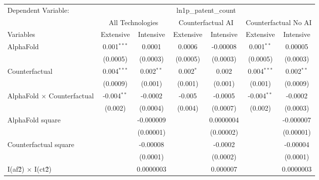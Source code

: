 \begingroup
\centering
\begin{tabular}{lcccccc}
   \tabularnewline \midrule \midrule
   Dependent Variable: & \multicolumn{6}{c}{ln1p\_patent\_count}\\
 & \multicolumn{2}{c}{All Technologies} & \multicolumn{2}{c}{Counterfactual AI} & \multicolumn{2}{c}{Counterfactual No AI} \\
\cmidrule(lr){1-1}\cmidrule(lr){2-3} \cmidrule(lr){4-5} \cmidrule(lr){6-7}
Variables & \multicolumn{1}{c}{Extensive} & \multicolumn{1}{c}{Intensive} & \multicolumn{1}{c}{Extensive} & \multicolumn{1}{c}{Intensive} & \multicolumn{1}{c}{Extensive} & \multicolumn{1}{c}{Intensive} \\
\cmidrule(lr){1-1}\cmidrule(lr){2-2} \cmidrule(lr){3-3} \cmidrule(lr){4-4} \cmidrule(lr){5-5} \cmidrule(lr){6-6} \cmidrule(lr){7-7}
   AlphaFold                          & 0.001$^{***}$ & 0.0001       & 0.0006      & -0.00008   & 0.001$^{**}$  & 0.00005\\   
                                      & (0.0005)      & (0.0003)     & (0.0005)    & (0.0003)   & (0.0005)      & (0.0003)\\   
   Counterfactual                     & 0.004$^{***}$ & 0.002$^{**}$ & 0.002$^{*}$ & 0.002      & 0.004$^{***}$ & 0.002$^{**}$\\   
                                      & (0.0009)      & (0.001)      & (0.001)     & (0.001)    & (0.001)       & (0.0009)\\   
   AlphaFold $\times$ Counterfactual  & -0.004$^{**}$ & -0.0002      & -0.005      & -0.0005    & -0.004$^{**}$ & -0.0002\\   
                                      & (0.002)       & (0.0004)     & (0.004)     & (0.0007)   & (0.002)       & (0.0003)\\   
   AlphaFold square                   &               & -0.000009    &             & 0.0000004  &               & -0.000007\\   
                                      &               & (0.00001)    &             & (0.00002)  &               & (0.00001)\\   
   Counterfactual square              &               & -0.00008     &             & -0.0002    &               & -0.00004\\   
                                      &               & (0.0001)     &             & (0.0002)   &               & (0.0001)\\   
   I(af\^2) $\times$ I(ct\^2)         &               & 0.0000003    &             & 0.000007   &               & 0.0000003\\   

\end{tabular}
